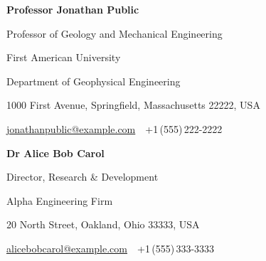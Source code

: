 \documentclass[a4paper,10pt,oneside]{article}
\begin{document}
\begin{body}
\textbf{Professor Jonathan Public}
\par
Professor of Geology and Mechanical Engineering
\begin{detail}
First American University
\par
Department of Geophysical Engineering
\par
1000 First Avenue, Springfield, Massachusetts 22222, USA
\par
\href{mailto:jonathanpublic@example.com}
{jonathanpublic@example.com}
\,\bulletsymbol\,
+1\,(555)\,222-2222
\end{detail}

\nextentry
\textbf{Dr Alice Bob Carol}
\par
Director, Research \& Development
\begin{detail}
Alpha Engineering Firm
\par
20 North Street, Oakland, Ohio 33333, USA
\par
\href{mailto:alicebobcarol@example.com}
{alicebobcarol@example.com}
\,\bulletsymbol\,
+1\,(555)\,333-3333
\end{detail}

\end{body}
\end{document}
